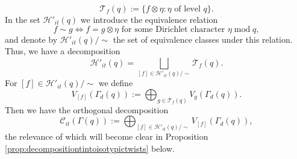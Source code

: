 \documentclass{article}
\theoremstyle{named}
\newcommand{\C}{\mathcal{C}}
\newcommand{\HH}{\mathcal{H}}
\newcommand{\T}{\mathcal{T}}
\DeclareMathOperator{\modulo}{mod}
\begin{document}
\begin{equation*}
    \T_f(q):= \{f\otimes \eta : \eta \text{ of level } q\}.
\end{equation*}
In the set $\HH'_{it}(q)$ we introduce the equivalence relation 
\begin{equation}\label{eq:equivalencerelationtwist}
    f \sim g \iff f = g \otimes \eta \text{ for some Dirichlet character }\eta \modulo q,
\end{equation} 
and denote by $\HH'_{it}(q)/\sim$ the set of equivalence classes under this relation. Thus, we have a decomposition
\begin{equation*}
    \HH'_{it}(q) = \bigsqcup_{[f] \in \HH'_{it}(q)/\sim } \T_f(q).
\end{equation*}
For $[f] \in \HH'_{it}(q)/\sim$ we define
\begin{equation}\label{eq:oldspacetwists}
    V_{[f]}(\Gamma_d(q)) := \bigoplus_{g \in \T_f(q)} V_g(\Gamma_d(q)).
\end{equation}
Then we have the orthogonal decomposition
\begin{equation}\label{eq:orthogonaldecompositionGammatwists}
    \C_{it}(\Gamma(q)) := \bigoplus_{[f] \in \HH'_{it}(q)/\sim} V_{[f]}(\Gamma_d(q)),
\end{equation}
the relevance of which will become clear in Proposition \ref{prop:decompositiontintoisotypictwists} below.
\end{document}
